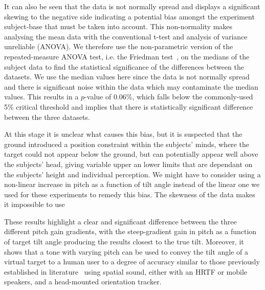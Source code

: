 \documentclass[format=sigconf, review=true, screen=true, anonymous=true]{acmart}
\begin{document}
It can also be seen that the data is not normally spread and displays a significant skewing to the negative side indicating a potential bias amongst the experiment subject-base that must be taken into account. This non-normality makes analysing the mean data with the conventional t-test and analysis of variance unreliable (ANOVA). We therefore use the non-parametric version of the repeated-measure ANOVA test, i.e. the Friedman test~\cite{friedman1937use}, on the medians of the subject data to find the statistical significance of the differences between the datasets. We use the median values here since the data is not normally spread and there is significant noise within the data which may contaminate the median values. This results in a $p$-value of 0.06\%, which falls below the commonly-used 5\% critical threshold and implies that there is statistically significant difference between the three datasets. 


At this stage it is unclear what causes this bias, but it is suspected that the ground introduced a position constraint within the subjects' minds, where the target could not appear below the ground, but can potentially appear well above the subjects' head, giving variable upper an lower limits that are dependant on the subjects' height and individual perception. We might have to consider using a non-linear increase in pitch as a function of tilt angle instead of the linear one we used for these experiments to remedy this bias. The skewness of the data makes it impossible to use 

These results highlight a clear and significant difference between the three different pitch gain gradients, with the steep-gradient gain in pitch as a function of target tilt angle producing the results closest to the true tilt. Moreover, it shows that a tone with varying pitch can be used to convey the tilt angle of a virtual target to a human user to a degree of accuracy similar to those previously established in literature~\cite{bujacz2011sonification, katz2011spatial, zotkin2004rendering} using spatial sound, either with an HRTF or mobile speakers, and a head-mounted orientation tracker.
\end{document}
